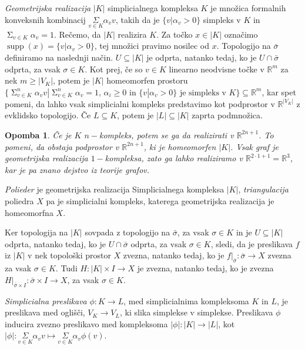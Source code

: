 \documentclass[a4paper,12pt]{article}
\DeclareRobustCommand{\si}{
    \bar{\sigma}
}
\DeclareMathOperator*{\supp}{supp}
\newcommand\mymathop[1]{\mathop{\operatorname{#1}}}
\theoremstyle{definition}
\theoremstyle{plain}
\theoremstyle{definition}
\theoremstyle{plain}
\theoremstyle{plain}
\theoremstyle{plain}
\newtheorem{opomba}{Opomba}
\theoremstyle{plain}
\begin{document}
\textit{Geometrijska realizacija} $|K|$ simplicialnega kompleksa $K$ je 
množica formalnih konveksnih kombinacij $\underset{v \in K}{\Sigma}\alpha_v v$, takih da je $\{v | \alpha_v > 0\}$ simpleks v $K$ in 
$\mymathop{\Sigma}_{v\in K}\alpha_v=1$. Rečemo, da $|K|$ realizira $K$. Za točko $x\in |K|$ označimo $\supp(x)=\{v | \alpha_v > 0\}$, 
tej množici pravimo nosilec od $x$. Topologijo na $\si$ definiramo na naslednji način. $U \subseteq |K|$ je odprta, natanko tedaj, ko je $U \cap 
\si$ odprta, za vsak $\sigma \in K$. Kot prej, če so $v\in K$ linearno neodvisne točke v $\mathbb{R}^m$ za nek $m\geq |V_K|$, potem je 
$|K|$ homeomorfen prostoru $\{\mymathop{\Sigma}_{v\in K}^{n}\alpha_v v | \mymathop{\Sigma}_{v\in K}^{n}\alpha_v = 1 \text{, } \alpha_i
\ge 0 \text{ in } \{v | \alpha_v > 0\} \text{ je simpleks v $K$}\} \subseteq \mathbb{R}^m$, kar spet pomeni, da lahko vsak simplicialni
kompleks predstavimo kot podprostor v $\mathbb{R}^{|V_K|}$ z evklidsko topologijo.
Če $L\subseteq K$, potem je $|L|\subseteq |K|$ zaprta podmnožica.

\begin{opomba}
    Če je $K$ $n-$kompleks, potem se ga da realizirati v $\mathbb{R}^{2n+1}$. To pomeni, da obstaja podprostor v
    $\mathbb{R}^{2n+1}$, ki je homeomorfen $|K|$. Vsak graf je geometrijska realizacija $1-$kompleksa, zato ga 
    lahko realiziramo v $\mathbb{R}^{2\cdot 1 +1}=\mathbb{R}^{3}$, kar je pa znano dejstvo iz teorije grafov.
\end{opomba}


\textit{Polieder} je geometrijska realizacija Simplicialnega kompleksa $|K|$, \textit{triangulacija} poliedra $X$ pa je simplicialni kompleks, katerega geometrijska realizacija je homeomorfna $X$.

Ker topologija na $|K|$ sovpada z topologijo na $\bar{\sigma}$, za vsak $\sigma\in K$ in je $U \subseteq |K|$ odprta, natanko tedaj, ko je $U \cap 
\si$ odprta, za vsak $\sigma \in K$, sledi, da je preslikava $f$ iz $|K|$ v nek topološki prostor $X$ zvezna, natanko tedaj, ko je $f|_{\bar{\sigma}}: \bar{\sigma} \rightarrow X$ zvezna za vsak $\sigma\in K$. Tudi $H:|K|\times I \rightarrow X$ je zvezna, natanko tedaj, ko je zvezna $H|_{\si\times I}:\si\times I \rightarrow X$, za vsak $\sigma\in K$.


\textit{Simplicialna preslikava} $\phi :K \rightarrow L$, med 
simplicialnima kompleksoma $K$ in $L$, je preslikava med 
oglišči, $V_K \rightarrow V_L$, ki slika simplekse v 
simplekse. Preslikava $\phi$ inducira zvezno preslikavo med 
kompleksoma $|\phi| :|K| \rightarrow |L|$, kot $|\phi|:
\underset{v \in K}{\Sigma}\alpha_v v \mapsto
\underset{v \in K}{\Sigma}\alpha_v \phi(v)$.
\end{document}
